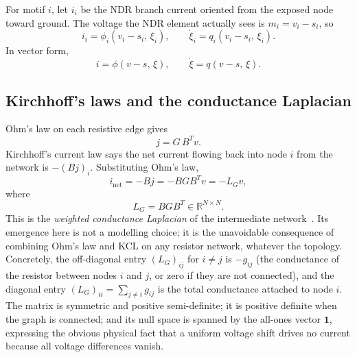 \documentclass[11pt]{article}
\begin{document}
For motif $i$, let $i_i$ be the NDR branch current oriented from the
exposed node toward ground. The voltage the NDR element actually sees
is $m_i = v_i - s_i$, so
\begin{equation}
  i_i = \phi_i(v_i - s_i,\, \xi_i),
  \qquad
  \dot\xi_i = q_i(v_i - s_i,\, \xi_i).
  \label{eq:ndr_current_voltage}
\end{equation}
In vector form,
\begin{equation}
  i = \phi(v - s,\,\xi),
  \qquad
  \dot\xi = q(v - s,\,\xi).
  \label{eq:vector_ndr}
\end{equation}

\subsection{Kirchhoff's laws and the conductance Laplacian}

Ohm's law on each resistive edge gives~\cite{desoer1969}
\begin{equation}
  j = G\,B^T v.
  \label{eq:edge_current_from_node_voltage}
\end{equation}
Kirchhoff's current law says the net current flowing back into node $i$
from the network is $-(Bj)_i$. Substituting Ohm's law,
\begin{equation}
  i_{\mathrm{net}} = -B j = -B G B^T v = -L_G v,
  \label{eq:network_current_injection_laplacian}
\end{equation}
where
\begin{equation}
  L_G = B G B^T \in \mathbb{R}^{N\times N}.
  \label{eq:conductance_laplacian}
\end{equation}
This is the \emph{weighted conductance Laplacian} of the intermediate
network~\cite{doyle1984,chung1997}. Its emergence here is not a
modelling choice; it is the unavoidable consequence of combining Ohm's
law and KCL on any resistor network, whatever the topology. Concretely,
the off-diagonal entry $(L_G)_{ij}$ for $i \neq j$ is $-g_{ij}$ (the
conductance of the resistor between nodes $i$ and $j$, or zero if they
are not connected), and the diagonal entry $(L_G)_{ii} = \sum_{j\neq
i}g_{ij}$ is the total conductance attached to node $i$. The matrix is
symmetric and positive semi-definite; it is positive definite when the
graph is connected; and its null space is spanned by the all-ones vector
$\mathbf{1}$, expressing the obvious physical fact that a uniform
voltage shift drives no current because all voltage differences vanish.
\end{document}
